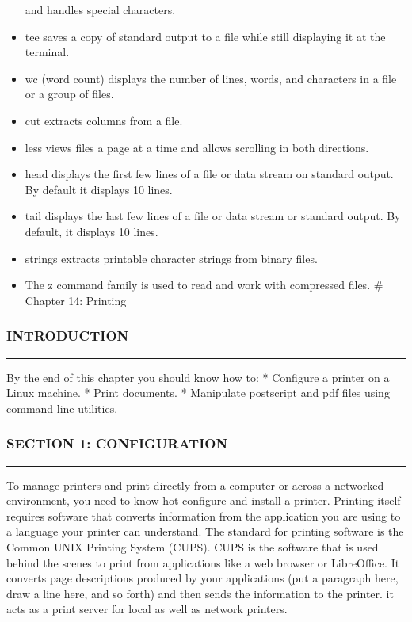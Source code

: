 \begin{itemize}
  and handles special characters.
\item
  tee saves a copy of standard output to a file while still displaying
  it at the terminal.
\item
  wc (word count) displays the number of lines, words, and characters in
  a file or a group of files.
\item
  cut extracts columns from a file.
\item
  less views files a page at a time and allows scrolling in both
  directions.
\item
  head displays the first few lines of a file or data stream on standard
  output. By default it displays 10 lines.
\item
  tail displays the last few lines of a file or data stream or standard
  output. By default, it displays 10 lines.
\item
  strings extracts printable character strings from binary files.
\item
  The z command family is used to read and work with compressed files.
  \# Chapter 14: Printing
\end{itemize}

\subsubsection{INTRODUCTION}\label{introduction-13}

\begin{center}\rule{3in}{0.4pt}\end{center}

By the end of this chapter you should know how to: * Configure a printer
on a Linux machine. * Print documents. * Manipulate postscript and pdf
files using command line utilities.

\subsubsection{SECTION 1: CONFIGURATION}\label{section-1-configuration}

\begin{center}\rule{3in}{0.4pt}\end{center}

To manage printers and print directly from a computer or across a
networked environment, you need to know hot configure and install a
printer. Printing itself requires software that converts information
from the application you are using to a language your printer can
understand. The standard for printing software is the Common UNIX
Printing System (CUPS). CUPS is the software that is used behind the
scenes to print from applications like a web browser or LibreOffice. It
converts page descriptions produced by your applications (put a
paragraph here, draw a line here, and so forth) and then sends the
information to the printer. it acts as a print server for local as well
as network printers.

